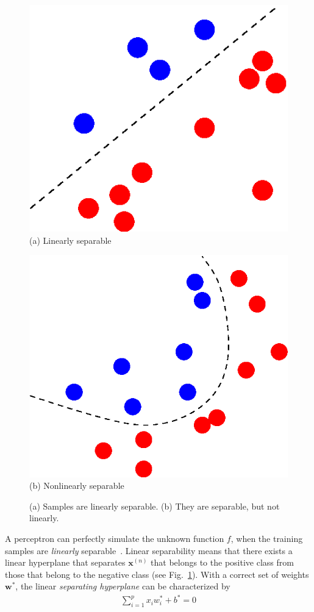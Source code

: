 \documentclass{now}
\newcommand{\vect}[1]{\mathbf{#1}}
\newcommand{\vx}[0]{\vect{x}}
\newcommand{\vw}[0]{\vect{w}}
\begin{document}
\begin{figure}[t]
    \begin{minipage}{0.48\textwidth}
        \centering
        \includegraphics[width=0.75\columnwidth]{../figures/linsep.eps}
        \\
        \small
        (a) Linearly separable
    \end{minipage}
    \begin{minipage}{0.48\textwidth}
        \centering
        \includegraphics[width=0.75\columnwidth]{../figures/nonlinsep.eps}
        \\
        \small
        (b) Nonlinearly separable
    \end{minipage}
    \caption{(a) Samples are linearly separable. (b) They are separable, but
    not linearly.}
    \label{fig:linsep}
\end{figure}

A perceptron can perfectly simulate the unknown function $f$, when the training
samples are \textit{linearly} separable~\citep{Minsky1969}.  Linear
separability means that there exists a linear hyperplane that separates
$\vx^{(n)}$ that belongs to the positive class from those that belong to the
negative class (see Fig.~\ref{fig:linsep}). With a correct set of weights
$\vw^*$, the linear \textit{separating hyperplane} can be characterized by
\begin{align*}
    \sum_{i=1}^p x_i w_i^* + b^* = 0
\end{align*}
\end{document}
